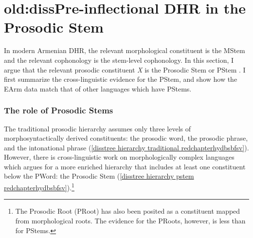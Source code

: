 



\section{old:dissPre-inflectional DHR in  the Prosodic Stem}\label{disssection: reduction: destressed reduction EA: pstem}

In modern Armenian DHR, the relevant morphological constituent is the MStem and the relevant cophonology is the stem-level cophonology.   In this section,  I argue that the relevant prosodic constituent \textit{X} is the Prosodic Stem or PStem \citep{Downing-1999-ProsodicStem}. I first summarize the  cross-linguistic evidence for the PStem, and show how the EArm data match that of other languages which have PStems. 

\subsubsection{The role of Prosodic Stems}\label{disssection: reduction: destressed reduction EA: pstem: role}

The traditional prosodic hierarchy assumes only three levels of morphosyntactically derived constituents: the prosodic word, the prosodic phrase, and the intonational phrase (\ref{disstree hierarchy traditional redchapterhydbsbfsv}).  However, there is  cross-linguistic work on morphologically complex languages  which  argues for a more enriched hierarchy that includes at least one constituent below the PWord: the Prosodic Stem (\ref{disstree hierarchy pstem redchapterhydbsbfsv}).\footnote{The Prosodic Root (PRoot) has also been posited as a constituent mapped from morphological roots. The evidence for the PRoots, however, is less than for PStems. } 



